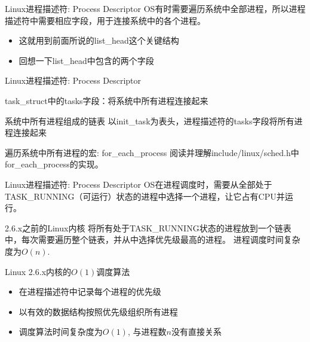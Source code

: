 \documentclass[xcolor=svgnames]{beamer}
\begin{document}
\begin{CJK*}{UTF8}{gbsn}

\begin{frame}{Linux进程描述符: Process Descriptor}
OS有时需要遍历系统中全部进程，所以进程描述符中需要相应字段，用于连接系统中的各个进程。
\begin{itemize}
\item 这就用到前面所说的list\_head这个关键结构
\item 回想一下list\_head中包含的两个字段
\end{itemize}
\end{frame}

\begin{frame}{Linux进程描述符: Process Descriptor}
\begin{block}{task\_struct中的tasks字段：将系统中所有进程连接起来} 
\lsttasks
\end{block}
\begin{block}{系统中所有进程组成的链表}
以init\_task为表头，进程描述符的tasks字段将所有进程连接起来
\end{block}
\begin{block}{遍历系统中所有进程的宏: for\_each\_process}
阅读并理解include/linux/sched.h中for\_each\_process的实现。
\end{block}
\end{frame}

\begin{frame}{Linux进程描述符: Process Descriptor}
OS在进程调度时，需要从全部处于TASK\_RUNNING（可运行）状态的进程中选择一个进程，让它占有CPU并运行。
\begin{block}{2.6.x之前的Linux内核}
将所有处于TASK\_RUNNING状态的进程放到一个链表中，每次需要遍历整个链表，并从中选择优先级最高的进程。
进程调度时间复杂度为$O(n)$.
\end{block}
\begin{block}{Linux 2.6.x内核的$O(1)$调度算法}
\begin{itemize}
\item 在进程描述符中记录每个进程的优先级
\item 以有效的数据结构按照优先级组织所有进程
\item 调度算法时间复杂度为$O(1)$, 与进程数$n$没有直接关系
\end{itemize}
\end{block}
\end{frame}


\end{CJK*}
\end{document}
